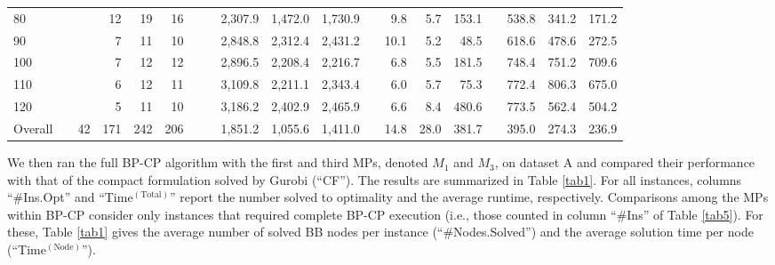 \documentclass[12pt]{article}
\begin{document}
\begin{table}[htbp]
{\begin{tabular}{lrrrrrrrrrrrrrrrrrr}
    80     &       &       & 12    & 19    & 16    &       &       & 2,307.9  & 1,472.0  & 1,730.9  &       & 9.8   & 5.7   & 153.1  &       & 538.8  & 341.2  & 171.2  \\
    90     &       &       & 7     & 11    & 10    &       &       & 2,848.8  & 2,312.4  & 2,431.2  &       & 10.1  & 5.2   & 48.5  &       & 618.6  & 478.6  & 272.5  \\
    100   &       &       & 7     & 12    & 12    &       &       & 2,896.5  & 2,208.4  & 2,216.7  &       & 6.8   & 5.5   & 181.5  &       & 748.4  & 751.2  & 709.6  \\
    110   &       &       & 6     & 12    & 11    &       &       & 3,109.8  & 2,211.1  & 2,343.4  &       & 6.0   & 5.7   & 75.3  &       & 772.4  & 806.3  & 675.0  \\
    120    &       &       & 5     & 11    & 10    &       &       & 3,186.2  & 2,402.9  & 2,465.9  &       & 6.6   & 8.4   & 480.6  &       & 773.5  & 562.4  & 504.2  \\
\cmidrule{1-1}\cmidrule{3-6}\cmidrule{8-11}\cmidrule{13-15}\cmidrule{17-19}  Overall   &       & 42    & 171   & 242   & 206   &       &       & 1,851.2  & 1,055.6  & 1,411.0  &       & 14.8  & 28.0  & 381.7  &       & 395.0  & 274.3  & 236.9  \\
    \bottomrule
    \end{tabular}
}

\end{table}

We then ran the full BP-CP algorithm with the first and third MPs, denoted $M_1$ and $M_3$, on dataset A and compared their performance with that of the compact formulation solved by Gurobi (``CF''). The results are summarized in Table \ref{tab1}. For all instances, columns ``\#Ins.Opt'' and ``Time$^{(\text{Total})}$'' report the number solved to optimality and the average runtime, respectively. Comparisons among the MPs within BP-CP consider only instances that required complete BP-CP execution (i.e., those counted in column ``\#Ins'' of Table \ref{tab5}). For these, Table \ref{tab1} gives the average number of solved BB nodes per instance (``\#Nodes.Solved'') and the average solution time per node (``Time$^{(\text{Node})}$'').
\end{document}

